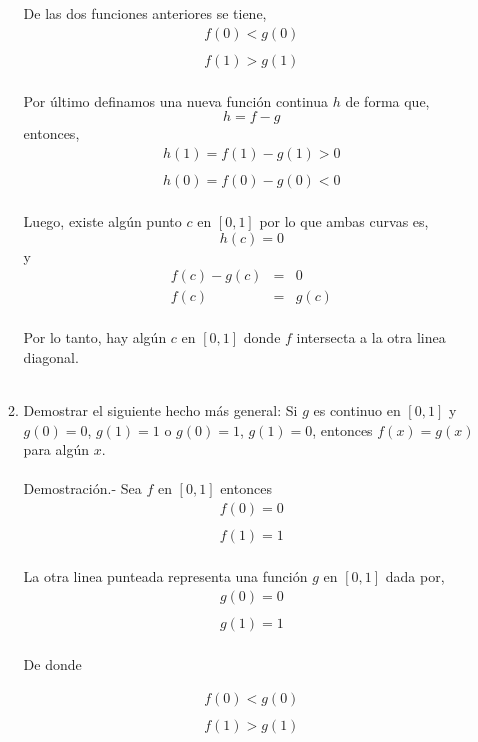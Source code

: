 \begin{enumerate}
\begin{enumerate}[\bfseries (a)]
	    De las dos funciones anteriores se tiene,
	    $$\begin{array}{l}
		f(0)<g(0)\\\\
		f(1)>g(1)\\
	    \end{array}$$

	    Por último definamos una nueva función continua $h$ de forma que,
	    $$h=f-g$$
	    entonces,
	    $$\begin{array}{l}
		h(1)=f(1)-g(1)>0\\\\
		h(0)=f(0)-g(0)<0\\
	    \end{array}$$
	    
	    Luego, existe algún punto $c$ en $[0,1]$ por lo que ambas curvas es,
	    $$h(c)=0$$
	    y 
	    $$\begin{array}{rcl}
		f(c)-g(c)&=&0\\
		f(c)&=&g(c)\\
	    \end{array}$$

	    Por lo tanto, hay algún $c$ en $[0,1]$ donde $f$ intersecta a la otra linea diagonal.\\\\

	\item Demostrar el siguiente hecho más general: Si $g$ es continuo en $[0,1]$ y $g(0)=0$, $g(1)=1$ o $g(0)=1$, $g(1)=0$, entonces $f(x)=g(x)$ para algún $x$.\\\\
	    Demostración.-\;  Sea $f$ en $[0,1]$ entonces
	    $$\begin{array}{l}
		f(0)=0\\\\
		f(1)=1\\
	    \end{array}$$

	    La otra linea punteada representa una función $g$ en $[0,1]$ dada por,
	    $$\begin{array}{l}
		g(0)=0\\\\
		g(1)=1\\
	    \end{array}$$

	    De donde 

	    $$\begin{array}{l}
		f(0)<g(0)\\\\
		f(1)>g(1)\\
	    \end{array}$$


\end{enumerate}
\end{enumerate}
